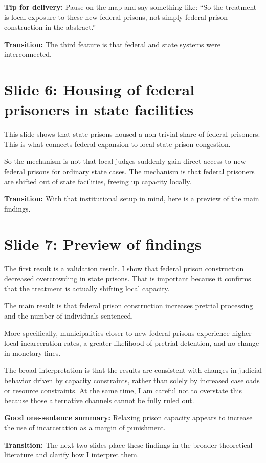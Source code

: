 \documentclass[11pt]{article}
\begin{document}
\textbf{Tip for delivery:}
Pause on the map and say something like: ``So the treatment is local exposure to these new federal prisons, not simply federal prison construction in the abstract.''

\textbf{Transition:} The third feature is that federal and state systems were interconnected.

\section{Slide 6: Housing of federal prisoners in state facilities}
This slide shows that state prisons housed a non-trivial share of federal prisoners. This is what connects federal expansion to local state prison congestion.

So the mechanism is not that local judges suddenly gain direct access to new federal prisons for ordinary state cases. The mechanism is that federal prisoners are shifted out of state facilities, freeing up capacity locally.

\textbf{Transition:} With that institutional setup in mind, here is a preview of the main findings.

\section{Slide 7: Preview of findings}
The first result is a validation result. I show that federal prison construction decreased overcrowding in state prisons. That is important because it confirms that the treatment is actually shifting local capacity.

The main result is that federal prison construction increases pretrial processing and the number of individuals sentenced.

More specifically, municipalities closer to new federal prisons experience higher local incarceration rates, a greater likelihood of pretrial detention, and no change in monetary fines.

The broad interpretation is that the results are consistent with changes in judicial behavior driven by capacity constraints, rather than solely by increased caseloads or resource constraints. At the same time, I am careful not to overstate this because those alternative channels cannot be fully ruled out.

\textbf{Good one-sentence summary:}
Relaxing prison capacity appears to increase the use of incarceration as a margin of punishment.

\textbf{Transition:} The next two slides place these findings in the broader theoretical literature and clarify how I interpret them.
\end{document}
